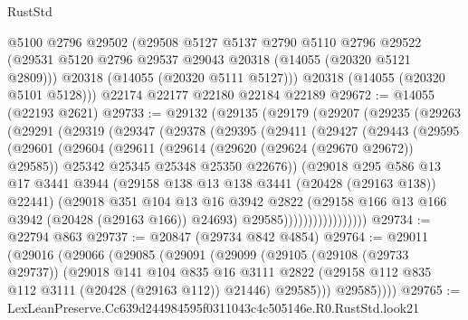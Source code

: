 \begin{lexlean}{RustStd}
\begin{coremodule}
      @5100
      @2796
      @29502
      (@29508
        @5127
        @5137
        @2790
        @5110
        @2796
        @29522
        (@29531 @5120 @2796 @29537 @29043 @20318 (@14055 (@20320 @5121 @2809)))
        @20318
        (@14055 (@20320 @5111 @5127)))
      @20318
      (@14055 (@20320 @5101 @5128)))
    @22174
    @22177
    @22180
    @22184
    @22189
@29672 := @14055 (@22193 @2621)
@29733 := @29132
    (@29135
      (@29179
        (@29207
          (@29235
            (@29263
              (@29291
                (@29319
                  (@29347
                    (@29378
                      (@29395
                        (@29411
                          (@29427
                            (@29443
                              (@29595
                                (@29601
                                  (@29604
                                    (@29611
                                      (@29614 (@29620 (@29624 (@29670 @29672)) @29585))
                                      @25342
                                      @25345
                                      @25348
                                      @25350
                                      @22676))
                                  (@29018
                                    @295
                                    @586
                                    @13
                                    @17
                                    @3441
                                    @3944
                                    (@29158 @138 @13 @138 @3441 (@20428 (@29163 @138)) @22441)
                                    (@29018
                                      @351
                                      @104
                                      @13
                                      @16
                                      @3942
                                      @2822
                                      (@29158 @166 @13 @166 @3942 (@20428 (@29163 @166)) @24693)
                                      @29585)))))))))))))))))
@29734 := @22794 @863
@29737 := @20847 (@29734 @842 @4854)
@29764 := @29011
    (@29016
      (@29066
        (@29085
          (@29091
            (@29099
              (@29105
                (@29108 (@29733 @29737))
                (@29018
                  @141
                  @104
                  @835
                  @16
                  @3111
                  @2822
                  (@29158 @112 @835 @112 @3111 (@20428 (@29163 @112)) @21446)
                  @29585)))
            @29585))))
@29765 := LexLeanPreserve.Cc639d244984595f0311043c4c505146e.R0.RustStd.look21

\end{coremodule}
\end{lexlean}
